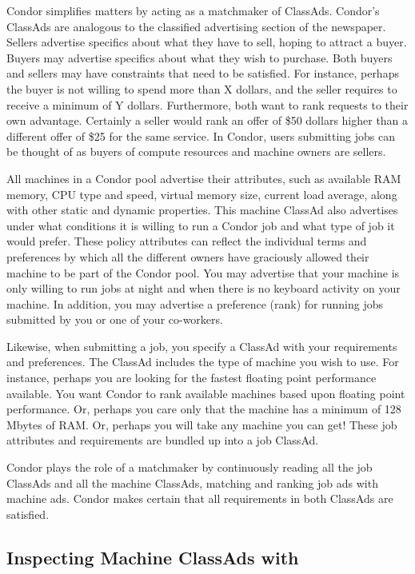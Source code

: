 Condor simplifies matters by acting as a matchmaker of ClassAds. Condor's
ClassAds
are analogous to the classified advertising section of the
newspaper. Sellers advertise specifics about what they have to sell,
hoping to attract a buyer. Buyers may advertise specifics about what
they wish to purchase. Both buyers and sellers may have constraints that
need to be satisfied. For instance, perhaps the buyer is not willing to
spend more than X dollars, and the seller requires to receive a minimum
of Y dollars. Furthermore, both want to rank requests
to their own advantage. Certainly a seller would rank
an offer  of \$50 dollars higher than a different
offer of \$25 for the same service. In Condor, users submitting
jobs can be thought of as buyers of compute resources and machine owners
are sellers. 

All machines in a Condor pool advertise their attributes,
such as
available RAM memory, CPU type and speed, virtual memory size, current
load average, along with other static and dynamic properties.
This machine ClassAd
also advertises under what conditions it is
willing to run a Condor job and what type of job it would prefer. These
policy attributes can reflect the individual terms and preferences by
which all the different owners have graciously allowed their machine to
be part of the Condor pool. 
You may
advertise that your machine is only willing to run jobs at night
and when there is no keyboard activity on your machine.
In addition, you may
advertise a preference (rank) for running jobs submitted by you
or one of your co-workers. 

Likewise, when submitting a job, you specify a ClassAd with
your requirements and preferences.
The ClassAd
includes the
type of machine you  wish to use. For instance, perhaps you are
looking for the fastest floating point performance available.
You want Condor to rank available machines
based upon floating point performance. Or, perhaps you
care only that the machine has a minimum of 128 Mbytes of RAM.
Or, perhaps you will
take any machine you can get! These job attributes and requirements
are bundled up into a job ClassAd.

Condor plays the role of a matchmaker by continuously reading
all the job ClassAds and all the machine ClassAds, 
matching and ranking job ads with machine ads.
Condor makes certain that all
requirements in both ClassAds are satisfied. 

\subsection{Inspecting Machine ClassAds with }

